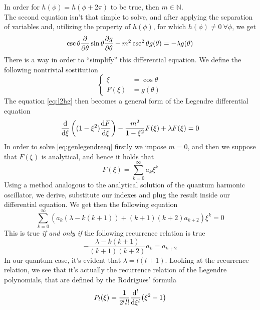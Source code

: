 \documentclass[../qm.tex]{subfiles}
\begin{document}
	In order for $h(\phi)=h(\phi+2\pi)$ to be true, then $m\in\mathbb{N}$.\\
	The second equation isn't that simple to solve, and after applying the separation of variables and, utilizing the property of $h(\phi)$, for which $h(\phi)\ne0\ \forall\phi$, we get
	\begin{equation}
		\csc{\theta}\pdv{\theta}\sin\theta\pdv{g}{\theta}-m^2\csc^2\theta g(\theta)=-\lambda g(\theta)
		\label{eq:l2hg}
	\end{equation}
	There is a way in order to ``simplify'' this differential equation. We define the following nontrivial sostitution
	\begin{equation*}
		\left\{
		\begin{aligned}
			\xi&=\cos\theta\\
			F(\xi)&=g(\theta)
		\end{aligned}
	\right.
	\end{equation*}
	The equation \eqref{eq:l2hg} then becomes a general form of the Legendre differential equation
	\begin{equation}
		\derivative{\xi}\left( (1-\xi^2)\derivative{F}{\xi} \right)-\frac{m^2}{1-\xi^2}F(\xi)+\lambda F(\xi)=0
		\label{eq:genlegendreeq}
	\end{equation}
	In order to solve \eqref{eq:genlegendreeq} firstly we impose $m=0$, and then we suppose that $F(\xi)$ is analytical, and hence it holds that
	\begin{equation*}
		F(\xi)=\sum_{k=0}^{\infty}a_k\xi^k
	\end{equation*}
	Using a method analogous to the analytical solution of the quantum harmonic oscillator, we derive, substitute our indexes and plug the result inside our differential equation. We get then the following equation
	\begin{equation}
		\sum_{k=0}^{\infty}\left( a_k(\lambda-k(k+1))+(k+1)(k+2)a_{k+2} \right)\xi^k=0
		\label{eq:sphharmseries}
	\end{equation}
	This is true \emph{if and only if} the following recurrence relation is true
	\begin{equation}
		-\frac{\lambda-k(k+1)}{(k+1)(k+2)}a_k=a_{k+2}
		\label{eq:recrel}
	\end{equation}
	In our quantum case, it's evident that $\lambda=l(l+1)$. Looking at the recurrence relation, we see that it's actually the recurrence relation of the Legendre polynomials, that are defined by the Rodrigues' formula
	\begin{equation}
		P_l(\xi)=\frac{1}{2^ll!}\derivative[l]{\xi}(\xi^2-1)
		\label{eq:rodrigueslpol}
	\end{equation}
\end{document}
